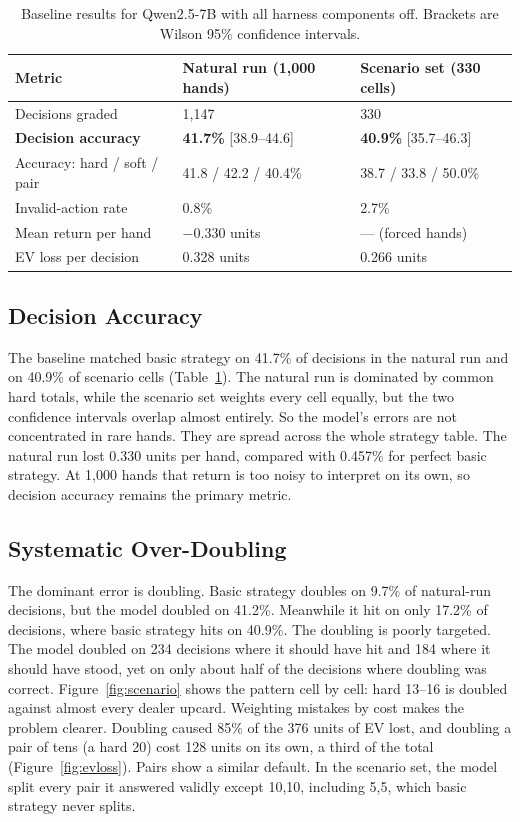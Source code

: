 \begin{table}[t]
  \caption{Baseline results for Qwen2.5-7B with all harness components off.
  Brackets are Wilson 95\% confidence intervals.}
  \label{tab:main}
  \begin{tabular}{lll}
    \toprule
    Metric & Natural run (1,000 hands) & Scenario set (330 cells) \\
    \midrule
    Decisions graded & 1,147 & 330 \\
    \textbf{Decision accuracy} & \textbf{41.7\%} [38.9--44.6] & \textbf{40.9\%} [35.7--46.3] \\
    Accuracy: hard / soft / pair & 41.8 / 42.2 / 40.4\% & 38.7 / 33.8 / 50.0\% \\
    Invalid-action rate & 0.8\% & 2.7\% \\
    Mean return per hand & $-0.330$ units & --- (forced hands) \\
    EV loss per decision & 0.328 units & 0.266 units \\
    \bottomrule
  \end{tabular}
\end{table}

\subsection{Decision Accuracy}

The baseline matched basic strategy on 41.7\% of decisions in the natural run
and on 40.9\% of scenario cells (Table~\ref{tab:main}). The natural run is
dominated by common hard totals, while the scenario set weights every cell
equally, but the two confidence intervals overlap almost entirely. So the
model's errors are not concentrated in rare hands. They are spread across the
whole strategy table. The natural run lost 0.330 units per hand, compared with
0.457\% for perfect basic strategy. At 1,000 hands that return is too noisy to
interpret on its own, so decision accuracy remains the primary metric.

\subsection{Systematic Over-Doubling}

The dominant error is doubling. Basic strategy doubles on 9.7\% of natural-run
decisions, but the model doubled on 41.2\%. Meanwhile it hit on only 17.2\% of
decisions, where basic strategy hits on 40.9\%. The doubling is poorly
targeted. The model doubled on 234 decisions where it should have hit and 184
where it should have stood, yet on only about half of the decisions where
doubling was correct. Figure~\ref{fig:scenario} shows the pattern cell by
cell: hard 13--16 is doubled against almost every dealer upcard. Weighting
mistakes by cost makes the problem clearer. Doubling caused 85\% of the 376
units of EV lost, and doubling a pair of tens (a hard 20) cost 128 units on its
own, a third of the total (Figure~\ref{fig:evloss}). Pairs show a similar
default. In the scenario set, the model split every pair it answered validly
except 10,10, including 5,5, which basic strategy never splits.

